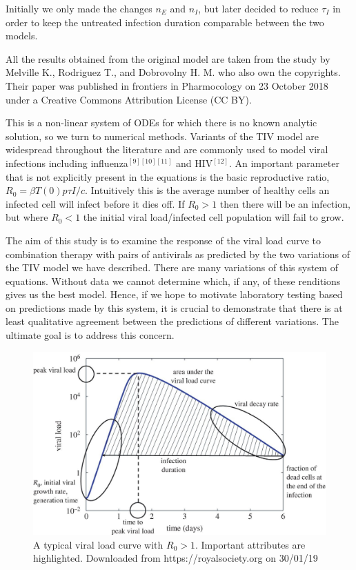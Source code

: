 \documentclass[a4paper,11pt]{article}
\begin{document}
Initially we only made the changes $n_E$ and $n_I$, but later decided to reduce $\tau_I$ in order to keep the untreated infection duration comparable between the two models.

All the results obtained from the original model are taken from the study by Melville K., Rodriguez T., and Dobrovolny H. M. who also own the copyrights. Their paper was published in frontiers in Pharmocology on 23 October 2018 under a Creative Commons Attribution License (CC BY).

This is a non-linear system of ODEs for which there is no known analytic solution, so we turn to numerical methods. Variants of the TIV model are widespread throughout the literature and are commonly used to model viral infections including influenza$^{[9][10][11]}$ and HIV$^{[12]}$. An important parameter that is not explicitly present in the equations is the basic reproductive ratio, $R_0 = \beta T(0)p\tau I/c$. Intuitively this is the average number of healthy cells an infected cell will infect before it dies off. If $R_0 > 1$ then there will be an infection, but where $R_0 < 1$ the initial viral load/infected cell population will fail to grow.

The aim of this study is to examine the response of the viral load curve to combination therapy with pairs of antivirals as predicted by the two variations of the TIV model we have described. There are many variations of this system of equations. Without data we cannot determine which, if any, of these renditions gives us the best model. Hence, if we hope to motivate laboratory testing based on predictions made by this system, it is crucial to demonstrate that there is at least qualitative agreement between the predictions of different variations. The ultimate goal is to address this concern.

\begin{figure}
    \centering
    \includegraphics[scale = 1.1]{viralcurve.jpg}
    \caption{\small A typical viral load curve with $R_0 > 1$. Important attributes are highlighted. Downloaded from https://royalsociety.org on 30/01/19
}
    \label{fig:my_label}
\end{figure}
\end{document}

